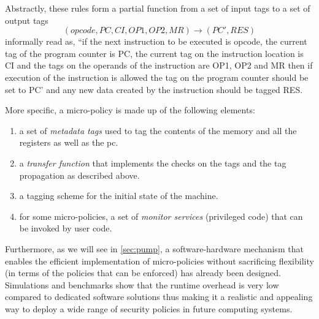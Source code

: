 Abstractly, these rules form a partial function from a set of
input tags to a set of output tags
$$(opcode,PC,CI,OP1,OP2,MR) \rightarrow (PC',RES)$$
informally read as, ``if the next instruction to be executed is opcode, the
current tag of the program counter is PC, the current tag on the
instruction location is CI and the tags on the operands of the
instruction are OP1, OP2 and MR then if execution of
the instruction is allowed the tag on the program counter should be set
to PC' and any new data created by the instruction should be tagged
RES.

More specific, a micro-policy is made up of the following elements:
\begin{enumerate}
\item a set of {\em metadata tags} used to tag the contents of the memory and
all the registers as well as the pc.
\item a {\em transfer function} that implements the checks on the tags and
the tag propagation as described above.
\item a tagging scheme for the initial state of the machine.
\item for some micro-policies, a set of {\em monitor services} (\IE privileged
code) that can be invoked by user code.
\end{enumerate}

Furthermore, as we will see in \cref{sec:pump}, a software-hardware
mechanism that enables the efficient implementation of micro-policies
without sacrificing flexibility (in terms of the policies that can be
enforced) has already been designed. Simulations and benchmarks show
that the runtime overhead is very low compared to dedicated software
solutions thus making it a realistic and appealing way to deploy a
wide range of security policies in future computing systems.

